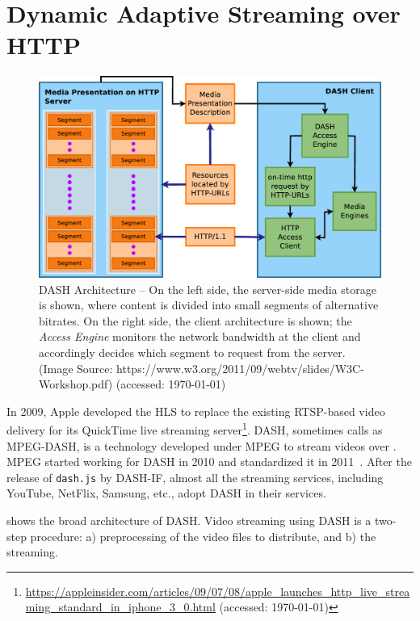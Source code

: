 \section{Dynamic Adaptive Streaming over HTTP}
\begin{figure}[!t]
	\centering
	\includegraphics[scale=0.25]{img/dash-arch}
	\caption{\small{DASH Architecture -- On the left side, the server-side media storage is shown, where content is divided into small segments of alternative bitrates. On the right side, the  client architecture is shown; the {\it {} Access Engine} monitors the network bandwidth at the client and accordingly decides which segment to request from the server. (Image Source: https://www.w3.org/2011/09/webtv/slides/W3C-Workshop.pdf) (accessed: \today)}}
	\label{fig:dash}
\end{figure}
In 2009, Apple developed the \ac{HLS} to replace the existing \ac{RTSP}-based video delivery for its QuickTime live streaming server\footnote{\url{https://appleinsider.com/articles/09/07/08/apple_launches_http_live_streaming_standard_in_iphone_3_0.html} (accessed: \today)}. \Ac{DASH}, sometimes calls as MPEG-DASH, is a technology developed under MPEG to stream videos over . MPEG started working for DASH in 2010 and standardized it in 2011~\cite{ISO/IEC23009-1:2019}. After the release of {\tt dash.js} by \ac{DASH-IF}, almost all the streaming services, including YouTube, NetFlix, Samsung, etc., adopt \ac{DASH} in their services.

\fig{\ref{fig:dash}} shows the broad architecture of \ac{DASH}. Video streaming using DASH is a two-step procedure: a) preprocessing of the video files to distribute, and b) the streaming. 


